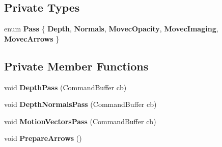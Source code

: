 \subsection*{Private Types}
\begin{DoxyCompactItemize}
\item 
\mbox{\label{class_unity_engine_1_1_post_processing_1_1_builtin_debug_views_component_af1b64dcf9ddd5cbda41d32931ce1a566}} 
enum {\bfseries Pass} \{ \newline
{\bfseries Depth}, 
{\bfseries Normals}, 
{\bfseries Movec\+Opacity}, 
{\bfseries Movec\+Imaging}, 
\newline
{\bfseries Movec\+Arrows}
 \}
\end{DoxyCompactItemize}
\subsection*{Private Member Functions}
\begin{DoxyCompactItemize}
\item 
\mbox{\label{class_unity_engine_1_1_post_processing_1_1_builtin_debug_views_component_a42465df6cb3dcf7306db70348ef57f5a}} 
void {\bfseries Depth\+Pass} (Command\+Buffer cb)
\item 
\mbox{\label{class_unity_engine_1_1_post_processing_1_1_builtin_debug_views_component_a42ede0dbe88072fdbe1304d7f17bf412}} 
void {\bfseries Depth\+Normals\+Pass} (Command\+Buffer cb)
\item 
\mbox{\label{class_unity_engine_1_1_post_processing_1_1_builtin_debug_views_component_ae8426e69bf4b5dc071c9e987f522d8b0}} 
void {\bfseries Motion\+Vectors\+Pass} (Command\+Buffer cb)
\item 
\mbox{\label{class_unity_engine_1_1_post_processing_1_1_builtin_debug_views_component_a6757a54480bc8c7b5e2b3d14d31e17d2}} 
void {\bfseries Prepare\+Arrows} ()
\end{DoxyCompactItemize}
